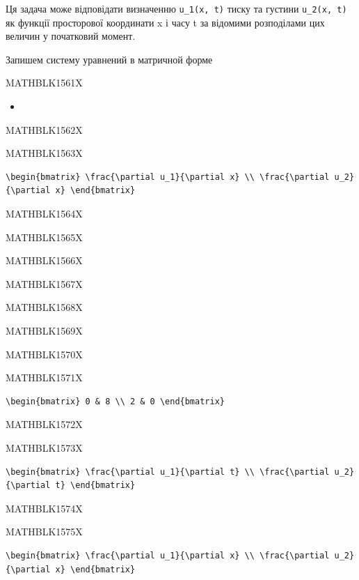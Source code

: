 \documentclass[
  ukrainian,
]{article}
\providecommand{\tightlist}{%
  \setlength{\itemsep}{0pt}\setlength{\parskip}{0pt}}
\begin{document}
Ця задача може відповідати визначенню \texttt{u\_1(x,\ t)} тиску та
густини \texttt{u\_2(x,\ t)} як функції просторової координати x і часу
t за відомими розподілами цих величин у початковий момент.

Запишем систему уравнений в матричной форме

MATHBLK1561X

\begin{itemize}
\tightlist
\item
\end{itemize}

MATHBLK1562X

MATHBLK1563X

\begin{verbatim}
\begin{bmatrix} \frac{\partial u_1}{\partial x} \\ \frac{\partial u_2}{\partial x} \end{bmatrix}
\end{verbatim}

MATHBLK1564X

MATHBLK1565X

MATHBLK1566X

MATHBLK1567X

MATHBLK1568X

MATHBLK1569X

MATHBLK1570X

MATHBLK1571X

\begin{verbatim}
\begin{bmatrix} 0 & 8 \\ 2 & 0 \end{bmatrix}
\end{verbatim}

MATHBLK1572X

MATHBLK1573X

\begin{verbatim}
\begin{bmatrix} \frac{\partial u_1}{\partial t} \\ \frac{\partial u_2}{\partial t} \end{bmatrix}
\end{verbatim}

MATHBLK1574X

MATHBLK1575X

\begin{verbatim}
\begin{bmatrix} \frac{\partial u_1}{\partial x} \\ \frac{\partial u_2}{\partial x} \end{bmatrix}
\end{verbatim}
\end{document}
